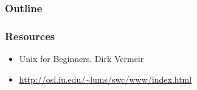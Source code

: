 
%

\author[Lecture S.2.]{Lecture S.2.: Introduction to Linux/Unix Part 2
\\\begin{center}\end{center}}









\maketitle

\begin{frame}\frametitle{Outline}
\end{frame}

\begin{frame}\frametitle{Resources}
\begin{itemize}
\item Unix for Beginners. Dirk Vermeir
\item \url{http://osl.iu.edu/~lums/swc/www/index.html}
\end{itemize}
\end{frame}



